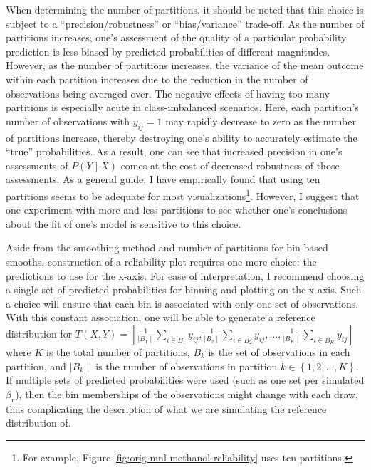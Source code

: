 \documentclass[preprint]{elsarticle}
\begin{document}
When determining the number of partitions, it should be noted that this choice is subject to a ``precision/robustness'' or ``bias/variance'' trade-off. As the number of partitions increases, one's assessment of the quality of a particular probability prediction is less biased by predicted probabilities of different magnitudes. However, as the number of partitions increases, the variance of the mean outcome within each partition increases due to the reduction in the number of observations being averaged over. The negative effects of having too many partitions is especially acute in class-imbalanced scenarios. Here, each partition's number of observations with $y_{ij} = 1$ may rapidly decrease to zero as the number of partitions increase, thereby destroying one's ability to accurately estimate the ``true'' probabilities. As a result, one can see that increased precision in one's assessments of $P \left( Y \mid X \right)$ comes at the cost of decreased robustness of those assessments. As a general guide, I have empirically found that using ten partitions seems to be adequate for most visualizations\footnote{For example, Figure \ref{fig:orig-mnl-methanol-reliability} uses ten partitions.}. However, I suggest that one experiment with more and less partitions to see whether one's conclusions about the fit of one's model is sensitive to this choice.

Aside from the smoothing method and number of partitions for bin-based smooths, construction of a reliability plot requires one more choice: the predictions to use for the x-axis. For ease of interpretation, I recommend choosing a single set of predicted probabilities for binning and plotting on the x-axis. Such a choice will ensure that each bin is associated with only one set of observations. With this constant association, one will be able to generate a reference distribution for $T \left( X, Y \right) = \left[ \frac{1}{\mid B_1 \mid} \sum _{i \in B_1} y_{ij} , \frac{1}{\mid B_2 \mid} \sum _{i \in B_2} y_{ij}, \dots, \frac{1}{\mid B_K \mid} \sum _{i \in B_K} y_{ij} \right]$ where $K$ is the total number of partitions, $B_k$ is the set of observations in each partition, and $\mid B_k \mid$ is the number of observations in partition $k \in \left\lbrace 1, 2, \dots, K \right\rbrace$. If multiple sets of predicted probabilities were used (such as one set per simulated  $\beta_r$), then the bin memberships of the observations might change with each draw, thus complicating the description of what we are simulating the reference distribution of.
\end{document}
